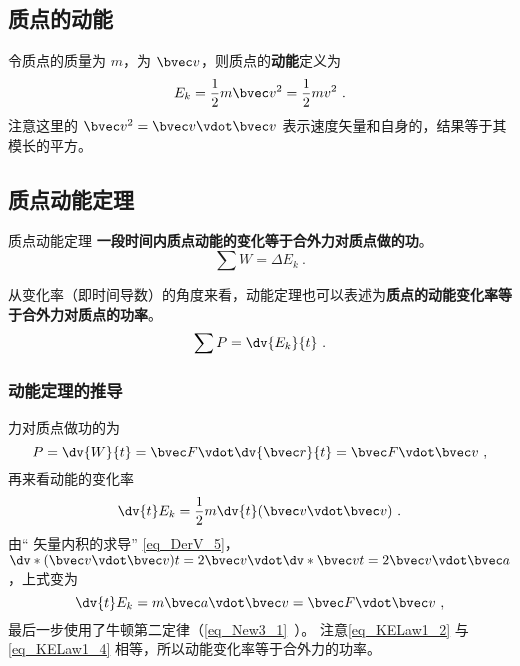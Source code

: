 
\subsection{质点的动能}
令质点的质量为 $m$，为 $\bvec v$，则质点的\textbf{动能}定义为
\begin{equation}
E_k = \frac12 m\bvec v^2 = \frac12 mv^2~.
\end{equation}
注意这里的 $\bvec v^2 = \bvec v \vdot \bvec v$ 表示速度矢量和自身的，结果等于其模长的平方。

\subsection{质点动能定理}
\begin{theorem}{质点动能定理}
\textbf{一段时间内质点动能的变化等于合外力对质点做的功}。
\begin{equation}
\sum W=\Delta E_k~.
\end{equation}

从变化率（即时间导数）的角度来看，动能定理也可以表述为\textbf{质点的动能变化率等于合外力对质点的功率}。
\begin{equation}
\sum P=\dv{E_k}{t}~.
\end{equation}
\end{theorem}

\subsubsection{动能定理的推导}
力对质点做功的为
\begin{equation}\label{eq_KELaw1_2}
P = \dv{W}{t} =  \bvec F\vdot \dv{\bvec r}{t} = \bvec F\vdot\bvec v~,
\end{equation}
再来看动能的变化率
\begin{equation}
\dv{t} E_k = \frac12 m\dv{t} (\bvec v\vdot\bvec v)~.
\end{equation}
由“ 矢量内积的求导” \autoref{eq_DerV_5}，$\dv*{(\bvec v\vdot\bvec v)}{t} = 2\bvec v\vdot \dv*{\bvec v}{t} = 2\bvec v\vdot\bvec a$，上式变为
\begin{equation}\label{eq_KELaw1_4}
\dv{t} E_k = m\bvec a\vdot\bvec v = \bvec F\vdot\bvec v~,
\end{equation}
最后一步使用了牛顿第二定律（\autoref{eq_New3_1}~）。 注意\autoref{eq_KELaw1_2} 与\autoref{eq_KELaw1_4} 相等，所以动能变化率等于合外力的功率。
